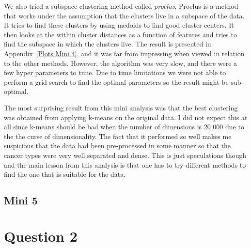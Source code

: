 \documentclass[11pt,twoside,swedish]{article}
\begin{document}
We also tried a subspace clustering method called
\emph{proclus}. Proclus is a method that works under the assumption
that the clusters live in a subspace of the data. It tries to find
these clusters by using medoids to find good cluster centers. It then
looks at the within cluster distances as a function of features and
tries to find the subspace in which the clusters live. The result is
presented in Appendix~\ref{Plots Mini 4}, and it was far from
impressing when viewed in relation to the other methods. However, the
algorithm was very slow, and there were a few hyper parameters to
tune. Due to time limitations we were not able to perform a grid
search to find the optimal parameters so the result might be
sub-optimal.  

\begin{table}[]
\centering
{}
\label{mini 4 summary}
\caption{Summary of results}
\end{table}

The most surprising result from this mini analysis was that the best
clustering was obtained from applying k-means on the original data. I
did not expect this at all since k-means should be bad when the number
of dimensions is 20 000 due to the the curse of dimensionality. The
fact that it performed so well makes me suspicious that the data had
been pre-processed in some manner so that the cancer types were
very well separated and dense. This is just speculations though and
the main lesson from this analysis is that one has to try different
methods to find the one that is suitable for the data.

\subsection{Mini 5}\label{Mini 5}

\section{Question 2}\label{Question 2}
\end{document}

